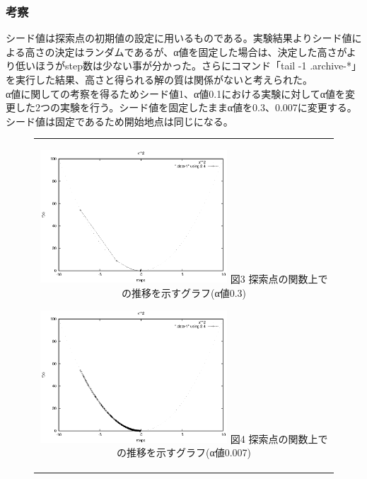 \subsubsection{考察}
シード値は探索点の初期値の設定に用いるものである。実験結果よりシード値による高さの決定はランダムであるが、α値を固定した場合は、決定した高さがより低いほうがstep数は少ない事が分かった。さらにコマンド「tail -1 .archive-*」を実行した結果、高さと得られる解の質は関係がないと考えられた。\\
α値に関しての考察を得るためシード値1、α値0.1における実験に対してα値を変更した2つの実験を行う。シード値を固定したままα値を0.3、0.007に変更する。シード値は固定であるため開始地点は同じになる。

\begin{figure}[htbp]
  \begin{center}
    \begin{tabular}{c}

      \begin{minipage}{0.5\hsize}
        \begin{center}
          \includegraphics[clip, width=7cm]{./figs/sim2-1-0_3.eps}
          \hspace{1.6cm} 図3 探索点の関数上での推移を示すグラフ(α値0.3)
        \end{center}
      \end{minipage}

      \begin{minipage}{0.5\hsize}
        \begin{center}
          \includegraphics[clip, width=7cm]{./figs/sim2-1-0_007.eps}
          \hspace{1.6cm} 図4 探索点の関数上での推移を示すグラフ(α値0.007)
        \end{center}
      \end{minipage}

    \end{tabular}
  \end{center}
\end{figure}
